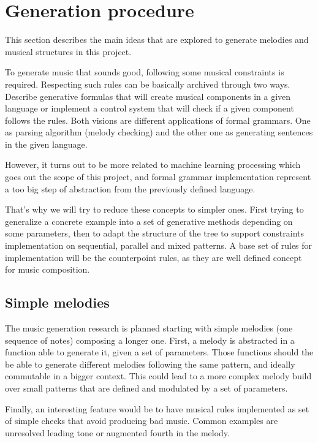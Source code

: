 \documentclass[preprint]{sigplanconf}
\begin{document}
\section{Generation procedure}
This section describes the main ideas that are explored to generate melodies and musical structures in this project.

To generate music that sounds good, following some musical constraints is required. Respecting such rules can be basically archived through two ways. Describe generative formulas that will create musical components in a given language or implement a control system that will check if a given component follows the rules. Both visions are different applications of formal grammars. One as parsing algorithm (melody checking) and the other one as generating sentences in the given language.

However, it turns out to be more related to machine learning processing which goes out the scope of this project, and formal grammar implementation represent a too big step of abstraction from the previously defined language.

That's why we will try to reduce these concepts to simpler ones. First trying to generalize a concrete example into a set of generative methods depending on some parameters, then to adapt the structure of the tree to support constraints implementation on sequential, parallel and mixed patterns.
A base set of rules for implementation will be the counterpoint rules, as they are well defined concept for music composition.


\subsection{Simple melodies}

The music generation research is planned starting with simple melodies (one sequence of notes) composing a longer one.
First, a melody is abstracted in a function able to generate it, given a set of parameters. Those functions should the be able to generate different melodies following the same pattern, and ideally commutable in a bigger context. This could lead to a more complex melody build over small patterns that are defined and modulated by a set of parameters.

Finally, an interesting feature would be to have musical rules implemented as set of simple checks that avoid producing bad music. Common examples are unresolved leading tone or augmented fourth in the melody. 
\end{document}
